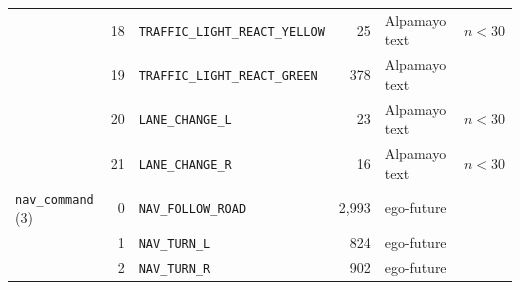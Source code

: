 \begin{center}
\begin{longtable}{@{}p{2.6cm}rp{6.3cm}rp{2.6cm}p{1.2cm}@{}}
 & 18 & \texttt{TRAFFIC\_LIGHT\_REACT\_YELLOW} & 25 & Alpamayo text & $n<30$ \\
 & 19 & \texttt{TRAFFIC\_LIGHT\_REACT\_GREEN} & 378 & Alpamayo text &  \\
 & 20 & \texttt{LANE\_CHANGE\_L} & 23 & Alpamayo text & $n<30$ \\
 & 21 & \texttt{LANE\_CHANGE\_R} & 16 & Alpamayo text & $n<30$ \\
\midrule
\texttt{nav\_command} (3) & 0 & \texttt{NAV\_FOLLOW\_ROAD} & 2,993 & ego-future &  \\
 & 1 & \texttt{NAV\_TURN\_L} & 824 & ego-future &  \\
 & 2 & \texttt{NAV\_TURN\_R} & 902 & ego-future &  \\
\bottomrule
\end{longtable}
\end{center}
